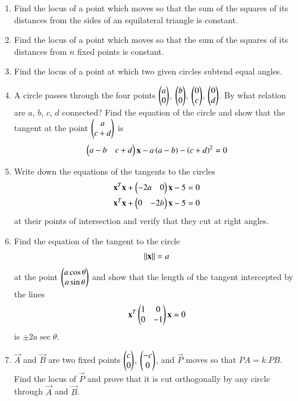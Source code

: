 \renewcommand{\theequation}{\theenumi}
\begin{enumerate}[label=\arabic*.,ref=\thesubsection.\theenumi]
\item Find the locus of a point which moves so that the sum of the squares of its distances from the sides of an equilateral triangle
is constant.
\item Find the locus of a point which moves so that the sum of the squares of its distances from $n$ fixed points is constant.
\item Find the locus of a point at which two given circles
subtend equal angles.
\item A circle passes through the four points $\begin{pmatrix}a\\0\end{pmatrix}$, $\begin{pmatrix}b\\0\end{pmatrix}$, $\begin{pmatrix}0\\c\end{pmatrix}$, $\begin{pmatrix}0\\d\end{pmatrix}$.  By what relation 
are $a$, $b$, $c$, $d$ connected?  Find the equation of the 
circle and show that the tangent at the point $\begin{pmatrix}a\\c+d\end{pmatrix}$ is
\begin{align}
\begin{pmatrix}a-b & c+d\end{pmatrix}\mathbf{x}
-a\left(a-b\right)-\left(c+d\right)^2=0
\end{align}
\item Write down the equations of the tangents to the circles
\begin{align}
\mathbf{x}^T\mathbf{x}+\begin{pmatrix}-2a & 0\end{pmatrix}\mathbf{x}-5 = 0
\\
\mathbf{x}^T\mathbf{x}+\begin{pmatrix}0 & -2b\end{pmatrix}\mathbf{x}-5 = 0
\end{align}
at their points of intersection and verify that they cut at right angles.
\item Find the equation of the tangent to the circle 
\begin{align}
\left\lVert\mathbf{x}\right\rVert=a
\end{align}
 at the point $\begin{pmatrix}a\cos\theta\\a\sin\theta\end{pmatrix}$ and show that the length of the
tangent intercepted by the lines 
\begin{align}
\mathbf{x}^T\begin{pmatrix}1 & 0\\0 & -1\end{pmatrix}\mathbf{x} = 0
\end{align}
is $\pm 2a\sec\theta$.
\item $\vec{A}$ and $\vec{B}$ are two fixed points $\begin{pmatrix}c\\0\end{pmatrix}$, $\begin{pmatrix}-c\\0\end{pmatrix}$, and $\vec{P}$ moves so that $PA=k.PB$.  Find the locus of $\vec{P}$ and prove that it is 
cut orthogonally by any circle through $\vec{A}$ and $\vec{B}$.

\end{enumerate}
